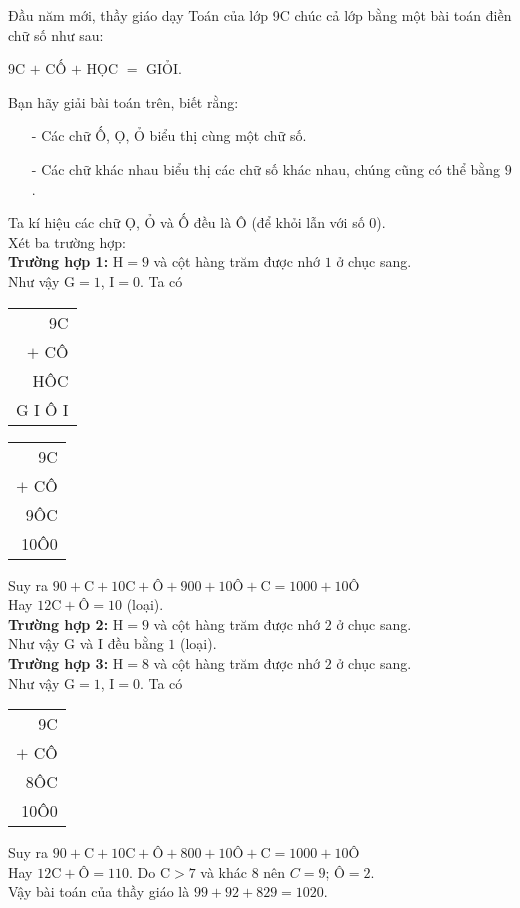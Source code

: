 \begin{bt}
 Đầu năm mới, thầy giáo dạy Toán của lớp 9C chúc cả lớp bằng một bài toán điền chữ số như sau:
 \begin{center}
  9C $+$ CỐ $+$ HỌC $=$ GIỎI.
 \end{center}
 Bạn hãy giải bài toán trên, biết rằng:
 \begin{itemize}
  \item[-] Các chữ Ố, Ọ, Ỏ biểu thị cùng một chữ số.
  \item[-] Các chữ khác nhau biểu thị các chữ số khác nhau, chúng cũng có thể bằng $9$.
 \end{itemize}
 \loigiai
  {
  \immini
  {
  Ta kí hiệu các chữ Ọ, Ỏ và Ố đều là Ô (để khỏi lẫn với số $0$).\\
  Xét ba trường hợp:\\
  \textbf{Trường hợp 1:} $\mathrm{H} = 9$ và cột hàng trăm được nhớ $1$ ở chục sang.\\
  Như vậy $\mathrm{G} = 1$, $\mathrm{I} = 0$. Ta có
  }
  {
  \begin{tabular}{r}
      9C \\
  $+$ CÔ \\
     HÔC \\
     \hline
    G I Ô I
  \end{tabular}
  }
  \begin{center}
  \begin{tabular}{r}
      9C \\
  $+$ CÔ \\
     9ÔC \\
     \hline
    10Ô0
  \end{tabular}
  \end{center}
  Suy ra $90 + \mathrm{C} + 10\mathrm{C} + \textrm{Ô} + 900 + 10 \textrm{Ô} + \mathrm{C} = 1000 + 10\textrm{Ô}$\\
  Hay $12\mathrm{C} + \textrm{Ô} = 10$ (loại).\\
  \textbf{Trường hợp 2:} $\mathrm{H} = 9$ và cột hàng trăm được nhớ $2$ ở chục sang.\\
  Như vậy $\mathrm{G}$ và $\mathrm{I}$ đều bằng $1$ (loại).\\
  \textbf{Trường hợp 3:} $\mathrm{H} = 8$ và cột hàng trăm được nhớ $2$ ở chục sang.\\
  Như vậy $\mathrm{G} = 1$, $\mathrm{I} = 0$. Ta có
  \begin{center}
  \begin{tabular}{r}
      9C \\
  $+$ CÔ \\
     8ÔC \\
     \hline
    10Ô0
  \end{tabular}
  \end{center}
  Suy ra $90 + \mathrm{C} + 10\mathrm{C} + \textrm{Ô} + 800 + 10 \textrm{Ô} + \mathrm{C} = 1000 + 10\textrm{Ô}$\\
  Hay $12\mathrm{C} + \textrm{Ô} = 110$. Do $\mathrm{C} > 7$ và khác $8$ nên $C = 9$; $\textrm{Ô} = 2$.\\
  Vậy bài toán của thầy giáo là $99 + 92 + 829 = 1020$.
  }
\end{bt}


